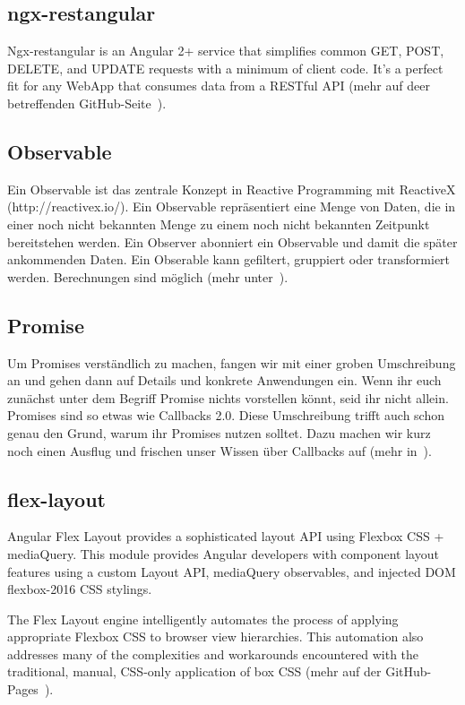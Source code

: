 \subsection{ngx-restangular}
Ngx-restangular is an Angular 2+ service that simplifies common GET, POST, DELETE, and UPDATE requests with a minimum of
client code. It's a perfect fit for any WebApp that consumes data from a RESTful API
(mehr auf deer betreffenden GitHub-Seite~\cite{online_grundlagen_restangular}).

\subsection{Observable}
Ein Observable ist das zentrale Konzept in Reactive Programming mit ReactiveX (http://reactivex.io/). Ein Observable
repräsentiert eine Menge von Daten, die in einer noch nicht bekannten Menge zu einem noch nicht bekannten Zeitpunkt
bereitstehen werden. Ein Observer abonniert ein Observable und damit die später ankommenden Daten. Ein Obserable kann
gefiltert, gruppiert oder transformiert werden. Berechnungen sind möglich (mehr unter~\cite{book_grundlagen_observable}).

\subsection{Promise}
Um Promises verständlich zu machen, fangen wir mit einer groben Umschreibung an und gehen dann auf Details und konkrete
Anwendungen ein. Wenn ihr euch zunächst unter dem Begriff Promise nichts vorstellen könnt, seid ihr nicht allein.
Promises sind so etwas wie Callbacks 2.0. Diese Umschreibung trifft auch schon genau den Grund, warum ihr Promises nutzen
solltet. Dazu machen wir kurz noch einen Ausflug und frischen unser Wissen über Callbacks auf
(mehr in~\cite{book_grundlagen_promises}).

\subsection{flex-layout}
Angular Flex Layout provides a sophisticated layout API using Flexbox CSS + mediaQuery. This module provides Angular
developers with component layout features using a custom Layout API, mediaQuery observables, and injected DOM
flexbox-2016 CSS stylings.

The Flex Layout engine intelligently automates the process of applying appropriate Flexbox CSS to browser view
hierarchies. This automation also addresses many of the complexities and workarounds encountered with the traditional,
manual, CSS-only application of box CSS (mehr auf der GitHub-Pages~\cite{online_grundlagen_flexlayout}).

